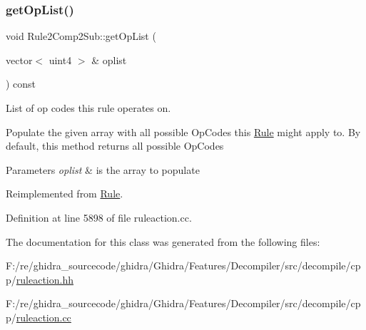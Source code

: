 \subsubsection{\texorpdfstring{getOpList()}{getOpList()}}
{\footnotesize\ttfamily void Rule2\+Comp2\+Sub\+::get\+Op\+List (\begin{DoxyParamCaption}\item[{vector$<$ uint4 $>$ \&}]{oplist }\end{DoxyParamCaption}) const\hspace{0.3cm}{\ttfamily [virtual]}}



List of op codes this rule operates on. 

Populate the given array with all possible Op\+Codes this \mbox{\hyperlink{class_rule}{Rule}} might apply to. By default, this method returns all possible Op\+Codes 
\begin{DoxyParams}{Parameters}
{\em oplist} & is the array to populate \\
\hline
\end{DoxyParams}


Reimplemented from \mbox{\hyperlink{class_rule_a4023bfc7825de0ab866790551856d10e}{Rule}}.



Definition at line 5898 of file ruleaction.\+cc.



The documentation for this class was generated from the following files\+:\begin{DoxyCompactItemize}
\item 
F\+:/re/ghidra\+\_\+sourcecode/ghidra/\+Ghidra/\+Features/\+Decompiler/src/decompile/cpp/\mbox{\hyperlink{ruleaction_8hh}{ruleaction.\+hh}}\item 
F\+:/re/ghidra\+\_\+sourcecode/ghidra/\+Ghidra/\+Features/\+Decompiler/src/decompile/cpp/\mbox{\hyperlink{ruleaction_8cc}{ruleaction.\+cc}}\end{DoxyCompactItemize}
